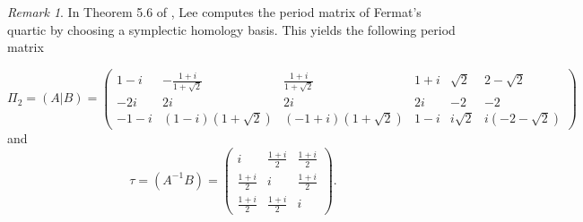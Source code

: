 \documentclass[12pt,reqno]{amsart}
\newcommand{\R}{\mathbb{R}}
\theoremstyle{definition}
\theoremstyle{remark}
\newtheorem*{remark}{Remark}
\begin{document}


 
\begin{remark} In Theorem 5.6 of \cite{dthesis}, Lee computes the period matrix of Fermat's quartic by choosing a symplectic homology basis. This yields the following period matrix

$$\Pi_2 = (A|B) = \begin{pmatrix}  1 - i& -\frac{1 + i}{1 + \sqrt{2}}& \frac{1 + i}{1 + \sqrt{2}}& 1 + i& \sqrt{2}& 2 - \sqrt{2} \\  -2i& 2i& 2i& 2i& -2& -2\\ -1 - i & (1 - i)(1 + \sqrt{2})& (-1 + i)(1 + \sqrt{2})& 1 - i& i\sqrt{2}& i(-2 - \sqrt{2})  \end{pmatrix} $$ and $$\tau = (A^{-1}B) = \begin{pmatrix}i & \frac{1 + i}{2} & \frac{1 + i}{2}\\
\frac{1 + i}{2} & i & \frac{1 + i}{2}\\
\frac{1 + i}{2} & \frac{1 + i}{2} & i\end{pmatrix}.$$\end{remark}
\end{document}

